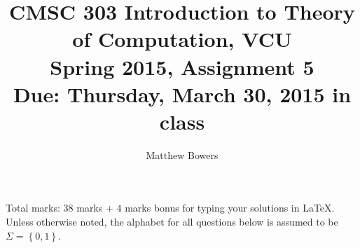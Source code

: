 \documentclass{article}
\author{Matthew Bowers}
\newcommand{\set}[1]{{\left\{#1\right\}}}    %
\begin{document}
\title{CMSC 303 Introduction to Theory of Computation, VCU\\Spring 2015, Assignment 5\\Due: Thursday, March 30, 2015 in class}
\date{}
\maketitle
\vspace{-5mm}
\noindent Total marks: $38$ marks + $4$ marks bonus for typing your solutions in LaTeX.\vspace{2mm}\\

\noindent Unless otherwise noted, the alphabet for all questions below is assumed to be $\Sigma=\set{0,1}$.
\end{document}
